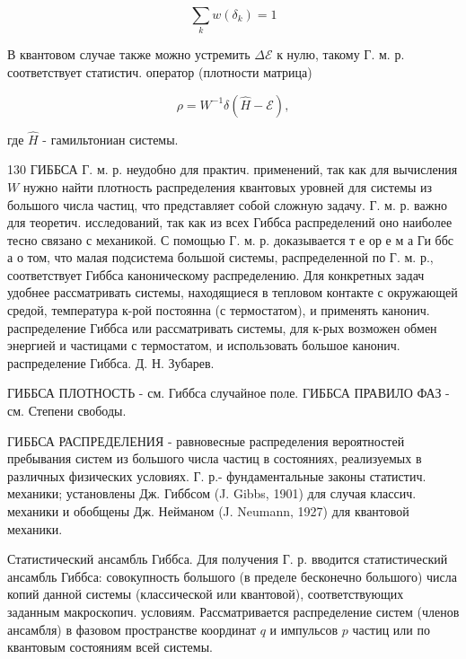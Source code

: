 \documentclass[10pt]{article}
\begin{document}
\[

\sum_{k} w\left(\mathscr{\delta}_{k}\right)=1

\]



В квантовом случае также можно устремить $\Delta \mathscr{E}$ к нулю, такому Г. м. р. соответствует статистич. оператор (плотности матрица)



\[

\rho=W^{-1} \delta(\hat{H}-\mathscr{E}),

\]



где $\hat{H}$ - гамильтониан системы.



130 ГИББСА Г. м. р. неудобно для практич. применений, так как для вычисления $W$ нужно найти плотность распределения квантовых уровней для системы из большого числа частиц, что представляет собой сложную задачу. Г. м. р. важно для теоретич. исследований, так как из всех Гиббса распределений оно наиболее тесно связано с механикой. С помощью Г. м. р. доказывается т е ор е м а Ги ббс а о том, что малая подсистема большой системы, распределенной по Г. м. р., соответствует Гиббса каноническому распределению. Для конкретных задач удобнее рассматривать системы, находящиеся в тепловом контакте с окружающей средой, температура к-рой постоянна (с термостатом), и применять канонич. распределение Гиббса или рассматривать системы, для к-рых возможен обмен энергией и частицами с термостатом, и использовать большое канонич. распределение Гиббса. Д. Н. Зубарев.



ГИББСА ПЛОТНОСТЬ - см. Гиббса случайное поле. ГИББСА ПРАВИЛО ФАЗ - см. Степени свободы.



ГИББСА РАСПРЕДЕЛЕНИЯ - равновесные распределения вероятностей пребывания систем из большого числа частиц в состояниях, реализуемых в различных физических условиях. Г. р.- фундаментальные законы статистич. механики; установлены Дж. Гиббсом (J. Gibbs, 1901) для случая классич. механики и обобщены Дж. Нейманом (J. Neumann, 1927) для квантовой механики.



Статистический ансамбль Гиббса. Для получения Г. р. вводится статистический ансамбль Гиббса: совокупность большого (в пределе бесконечно большого) числа копий данной системы (классической или квантовой), соответствующих заданным макроскопич. условиям. Рассматривается распределение систем (членов ансамбля) в фазовом пространстве координат $q$ и импульсов $p$ частиц или по квантовым состояниям всей системы.
\end{document}
